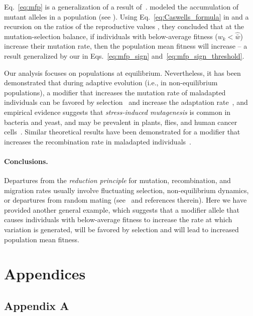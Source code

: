 \documentclass[9pt, a4paper, twocolumn]{extarticle}
\begin{document}
Eq.~\ref{eq:mfp} is a generalization of a result of~\citet[Eq.~4]{Ram2012}.
\citeauthor{Ram2012} modeled the accumulation of mutant alleles in a population (see ).
Using Eq.~\ref{eq:Caswells_formula} in  and a recursion on the ratios of the reproductive values \cite[see][eqs.~A5-6]{Ram2012}, they concluded that at the mutation-selection balance, if individuals with below-average fitness ($w_k < \hat{\bar w}$) increase their mutation rate, then the population mean fitness will increase -- a result generalized by our \emph{} in Eqs.~\ref{eq:mfp_sign} and~\ref{eq:mfp_sign_threshold}.

Our analysis focuses on populations at equilibrium.
Nevertheless, it has been demonstrated that during adaptive evolution (i.e., in non-equilibrium populations), a modifier that increases the mutation rate of maladapted individuals can be favored by selection~\citep{Ram2012,Lukacisinova2017} and increase the adaptation rate~\citep{Ram2014},
and empirical evidence suggests that \emph{stress-induced mutagenesis} is common in bacteria and yeast, and may be prevalent in plants, flies, and human cancer cells~\citep{Rosenberg2012,Fitzgerald2017b}.
Similar theoretical results have been demonstrated for a modifier that increases the recombination rate in maladapted individuals~\citep{Hadany2003b,Hadany2003a}.

\paragraph*{Conclusions.}

Departures from the \emph{reduction principle} for mutation, recombination, and migration rates usually involve fluctuating selection,  non-equilibrium dynamics, or departures from random mating (see~\cite{Carja2014} and references therein).
Here we have provided another general example, which suggests that a modifier allele that causes individuals with below-average fitness to increase the rate at which variation is generated, will be favored by selection and will lead to increased population mean fitness.

\section*{Appendices}

\subsection*{Appendix A}\label{sec:AppA}
\end{document}
